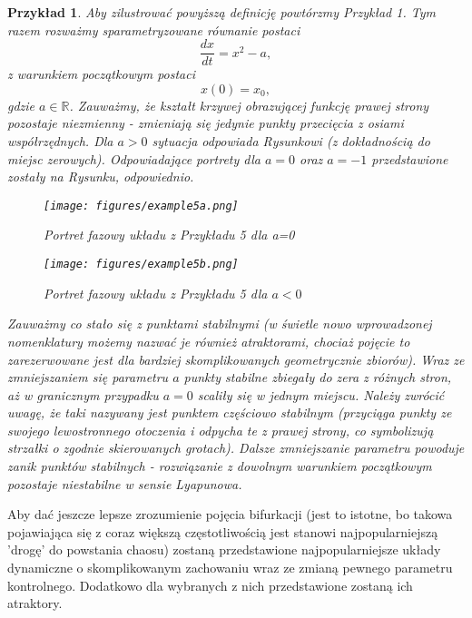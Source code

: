 \documentclass[12pt]{article}
\newtheorem{przyklad}{Przykład}
\begin{document}
\begin{przyklad}\label{przyklad5}
	Aby zilustrować powyższą definicję powtórzmy Przykład 1. Tym razem rozważmy sparametryzowane równanie postaci
	\begin{equation}
	\frac{dx}{dt} = x^2-a,
	\end{equation}
	z warunkiem początkowym postaci
	\begin{equation}
	x(0) = x_{0},
	\end{equation}
	gdzie $ a \in \mathbb{R} $. Zauważmy, że kształt krzywej obrazującej funkcję prawej strony pozostaje niezmienny - zmieniają się jedynie punkty przecięcia z osiami współrzędnych. Dla $ a > 0 $ sytuacja odpowiada Rysunkowi (z dokładnością do miejsc zerowych). Odpowiadające portrety dla $ a = 0 $ oraz $ a = -1 $ przedstawione zostały na Rysunku, odpowiednio.
	\begin{figure}[H]
	\texttt{[image: figures/example5a.png]} 
	\centering
	\caption{Portret fazowy układu z Przykładu 5 dla a=0}
	\end{figure}
	\begin{figure}[H]
	\texttt{[image: figures/example5b.png]} 
	\centering
	\caption{Portret fazowy układu z Przykładu 5 dla $ a<0 $}
	\end{figure}
Zauważmy co stało się z punktami stabilnymi (w świetle nowo wprowadzonej nomenklatury możemy nazwać je również atraktorami, chociaż pojęcie to zarezerwowane jest dla bardziej skomplikowanych geometrycznie zbiorów). Wraz ze zmniejszaniem się parametru $ a $ punkty stabilne zbiegały do zera z różnych stron, aż w granicznym przypadku $ a=0 $ scaliły się w jednym miejscu. Należy zwrócić uwagę, że taki nazywany jest punktem częściowo stabilnym (przyciąga punkty ze swojego lewostronnego otoczenia i odpycha te z prawej strony, co symbolizują strzałki o zgodnie skierowanych grotach). Dalsze zmniejszanie parametru powoduje zanik punktów stabilnych - rozwiązanie z dowolnym warunkiem początkowym pozostaje niestabilne w sensie Lyapunowa. 
\end{przyklad}
Aby dać jeszcze lepsze zrozumienie pojęcia bifurkacji (jest to istotne, bo takowa pojawiająca się z coraz większą częstotliwością jest stanowi najpopularniejszą 'drogę' do powstania chaosu) zostaną przedstawione najpopularniejsze układy dynamiczne o skomplikowanym zachowaniu wraz ze zmianą pewnego parametru kontrolnego. Dodatkowo dla wybranych z nich przedstawione zostaną ich atraktory.
\end{document}
